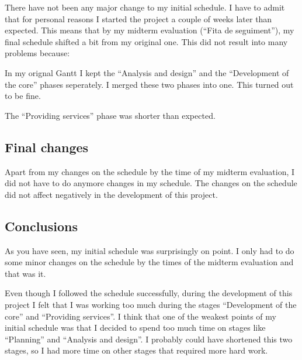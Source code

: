 There have not been any major change to my initial schedule. I have to admit
that for personal reasons I started the project a couple of weeks later
than expected. This means that by my midterm evaluation (``Fita de
seguiment''), my final schedule shifted a bit from my original one. This did not
result into many problems because:

\mylist
  \item In my orignal Gantt I kept the ``Analysis and design'' and the
``Development of the core'' phases seperately. I merged these two phases into
one. This turned out to be fine.
  \item The ``Providing services'' phase was shorter than expected.
\mylistend

\subsection{Final changes}

Apart from my changes on the schedule by the time of my midterm evaluation, I
did not have to do anymore changes in my schedule. The changes on the schedule
did not affect negatively in the development of this project.

\subsection{Conclusions}

As you have seen, my initial schedule was surprisingly on point. I only had to
do some minor changes on the schedule by the times of the midterm evaluation
and that was it.

Even though I followed the schedule successfully, during the development of
this project I felt that I was working too much during the stages ``Development
of the core'' and ``Providing services''. I think that one of the weakest
points of my initial schedule was that I decided to spend too much time on
stages like ``Planning'' and ``Analysis and design''. I probably could have
shortened this two stages, so I had more time on other stages that required
more hard work.
